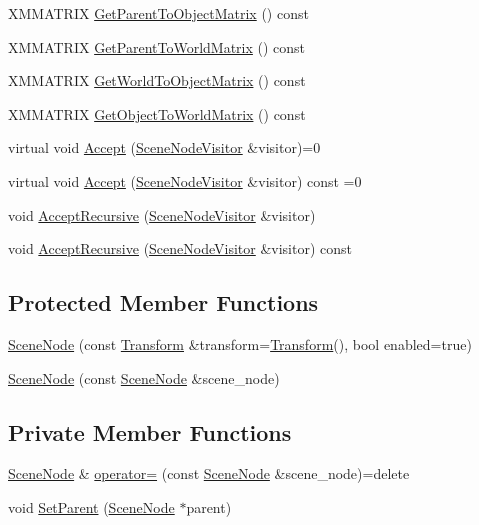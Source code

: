 \begin{DoxyCompactItemize}
\item 
X\+M\+M\+A\+T\+R\+IX \hyperlink{classmage_1_1_scene_node_a5ec8b0d2e5ba7873842c0fa65e1248bb}{Get\+Parent\+To\+Object\+Matrix} () const
\item 
X\+M\+M\+A\+T\+R\+IX \hyperlink{classmage_1_1_scene_node_afb199589e809c3cb0e46a691a737e5da}{Get\+Parent\+To\+World\+Matrix} () const
\item 
X\+M\+M\+A\+T\+R\+IX \hyperlink{classmage_1_1_scene_node_a0ddba0d70a8b2ce0ef80f25673d0dd56}{Get\+World\+To\+Object\+Matrix} () const
\item 
X\+M\+M\+A\+T\+R\+IX \hyperlink{classmage_1_1_scene_node_a4325660d42f5f393c77389a44aedb5cb}{Get\+Object\+To\+World\+Matrix} () const
\item 
virtual void \hyperlink{classmage_1_1_scene_node_a32ed8763c8f8b4caa155f64551d96f13}{Accept} (\hyperlink{classmage_1_1_scene_node_visitor}{Scene\+Node\+Visitor} \&visitor)=0
\item 
virtual void \hyperlink{classmage_1_1_scene_node_a35fbfd49185fb61cb4e9edf56af35262}{Accept} (\hyperlink{classmage_1_1_scene_node_visitor}{Scene\+Node\+Visitor} \&visitor) const =0
\item 
void \hyperlink{classmage_1_1_scene_node_a87f53bc4edcbfcd9cf7c2390c4a99ae4}{Accept\+Recursive} (\hyperlink{classmage_1_1_scene_node_visitor}{Scene\+Node\+Visitor} \&visitor)
\item 
void \hyperlink{classmage_1_1_scene_node_a3463a687f049dac387500a6ace5f62e7}{Accept\+Recursive} (\hyperlink{classmage_1_1_scene_node_visitor}{Scene\+Node\+Visitor} \&visitor) const
\end{DoxyCompactItemize}
\subsection*{Protected Member Functions}
\begin{DoxyCompactItemize}
\item 
\hyperlink{classmage_1_1_scene_node_a3cf69b4acd80f1e4452e603e9c713cbf}{Scene\+Node} (const \hyperlink{structmage_1_1_transform}{Transform} \&transform=\hyperlink{structmage_1_1_transform}{Transform}(), bool enabled=true)
\item 
\hyperlink{classmage_1_1_scene_node_a0259a6b573eb633b589cd986b9ec6734}{Scene\+Node} (const \hyperlink{classmage_1_1_scene_node}{Scene\+Node} \&scene\+\_\+node)
\end{DoxyCompactItemize}
\subsection*{Private Member Functions}
\begin{DoxyCompactItemize}
\item 
\hyperlink{classmage_1_1_scene_node}{Scene\+Node} \& \hyperlink{classmage_1_1_scene_node_af4298cbc808139f9da43055afdfe8f7e}{operator=} (const \hyperlink{classmage_1_1_scene_node}{Scene\+Node} \&scene\+\_\+node)=delete
\item 
void \hyperlink{classmage_1_1_scene_node_a27d5219ff4c1f2b1c37899456af518ae}{Set\+Parent} (\hyperlink{classmage_1_1_scene_node}{Scene\+Node} $\ast$parent)
\end{DoxyCompactItemize}
